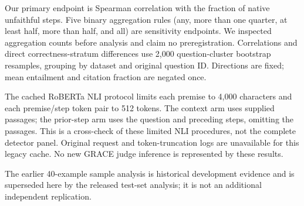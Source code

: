 \documentclass[11pt]{article}
\begin{document}
Our primary endpoint is Spearman correlation with the fraction of native
unfaithful steps. Five binary aggregation rules (any, more than one quarter,
at least half, more than half, and all) are sensitivity endpoints. We inspected
aggregation counts before analysis and claim no preregistration. Correlations
and direct correctness-stratum differences use 2,000 question-cluster bootstrap
resamples, grouping by dataset and original question ID. Directions are fixed;
mean entailment and citation fraction are negated once.

The cached RoBERTa NLI protocol limits each premise to 4,000 characters and each
premise/step token pair to 512 tokens. The context arm uses supplied passages;
the prior-step arm uses the question and preceding steps, omitting the passages.
This is a cross-check of these limited NLI procedures, not the complete detector
panel. Original request and token-truncation logs are unavailable for this legacy
cache. No new GRACE judge inference is represented by these results.



The earlier 40-example sample analysis is historical development evidence and
is superseded here by the released test-set analysis; it is not an additional
independent replication.
\end{document}
